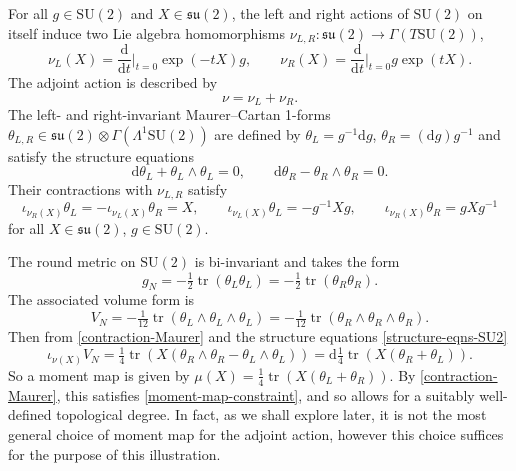 \documentclass[10pt,a4paper]{amsart}
\newcommand{\su}{{\mathfrak{su}}}
\newcommand{\SU}{{\mathrm{SU}}}
\newcommand{\1}{{\mathbb{1}}}
\def \d{\mathrm{d}}
\newcommand{\tr}{{\operatorname{tr}}}
\numberwithin{equation}{section}
\begin{document}
For all $g\in\SU(2)$ and $X\in\su(2)$, the left and right actions of $\SU(2)$ on itself induce two Lie algebra homomorphisms $\nu_{L,R}\colon \su(2)\to\Gamma(T\SU(2))$,
\begin{equation*}
\nu_L(X)=\frac{\d}{\d t}\Big|_{t=0}\exp(-tX)g,\qquad\nu_R(X)=\frac{\d}{\d t}\Big|_{t=0}g\exp(tX).
\end{equation*}
The adjoint action is described by
\begin{equation*}
\nu=\nu_L+\nu_R.
\end{equation*}
The left- and right-invariant Maurer--Cartan 1-forms $\theta_{L,R}\in\su(2)\otimes\Gamma(\Lambda^1\SU(2))$ are defined by $\theta_L=g^{-1}\d g$, $\theta_R=(\d g)g^{-1}$ and satisfy the structure equations
\begin{equation}\label{structure-eqns-SU2}
\d\theta_L+\theta_L\wedge\theta_L=0,\qquad\d\theta_R-\theta_R\wedge\theta_R=0.
\end{equation}
Their contractions with $\nu_{L,R}$ satisfy{\samepage
\begin{equation}\label{contraction-Maurer}
\iota_{\nu_R(X)}\theta_L=-\iota_{\nu_L(X)}\theta_R=X,\qquad \iota_{\nu_L(X)}\theta_L = -g^{-1}Xg,\qquad \iota_{\nu_R(X)}\theta_R = gXg^{-1}
\end{equation}
for all $X\in\su(2)$, $g\in\SU(2)$.}

The round metric on $\SU(2)$ is bi-invariant and takes the form
\begin{equation*}
g_N=-\tfrac{1}{2}\tr(\theta_L\theta_L)=-\tfrac{1}{2}\tr(\theta_R\theta_R).
\end{equation*}
The associated volume form is
\begin{equation*}
V_N=-\tfrac{1}{12}\tr(\theta_L\wedge\theta_L\wedge\theta_L)=-\tfrac{1}{12}\tr(\theta_R\wedge\theta_R\wedge\theta_R).
\end{equation*}
Then from \eqref{contraction-Maurer} and the structure equations \eqref{structure-eqns-SU2}
\begin{equation*}
\iota_{\nu(X)}V_N = \tfrac{1}{4}\tr(X(\theta_R\wedge\theta_R-\theta_L\wedge\theta_L))
=\d\tfrac{1}{4}\tr(X(\theta_R+\theta_L)).
\end{equation*}
So a moment map is given by $\mu(X)=\tfrac{1}{4}\tr(X(\theta_L+\theta_R))$. By \eqref{contraction-Maurer}, this satisfies \eqref{moment-map-constraint}, and so allows for a suitably well-defined topological degree. In fact, as we shall explore later, it is not the most general choice of moment map for the adjoint action, however this choice suffices for the purpose of this illustration.
\end{document}
